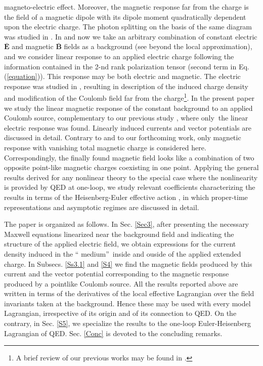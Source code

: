 \documentclass[12pt]{article}
\begin{document}
magneto-electric effect. Moreover, the magnetic response far from the charge
is the field of a magnetic dipole with its dipole moment quadratically
dependent upon the electric charge. The photon splitting on the basis of the
same diagram was studied in \cite{merging}. In \cite{AdoGitSha2016} and now
we take an arbitrary combination of constant electric $\mathbf{\bar{E}}$ and
magnetic $\mathbf{\bar{B}}$ fields as a background (see \cite{BatSha71}
beyond the local approximation), and we consider linear response to an
applied electric charge following the information contained in the 2-nd rank
polarization tensor (second term in Eq. (\ref{equation})). This response may
be both electric and magnetic. The electric response was studied in \cite%
{AdoGitSha2016}, resulting in description of the induced charge density and
modification of the Coulomb field far from the charge\footnote{%
A brief review of our previous works may be found in \cite{AdoGitShaShi2016}.%
}. In the present paper we study the linear magnetic response of the
constant background to an applied Coulomb source, complementary to our
previous study \cite{AdoGitSha2016}, where only\textrm{\textbf{\ }}the
linear electric response was found. Linearly induced currents and vector
potentials are discussed in detail. Contrary to \cite{AdoGitSha2015} and to
our forthcoming work, only magnetic response with vanishing total magnetic
charge is considered here. Correspondingly, the finally found magnetic field
looks like a combination of two opposite point-like magnetic charges
coexisting in one point. Applying the general results derived for any
nonlinear theory to the special case where the nonlinearity is provided by
QED at one-loop, we study relevant coefficients characterizing the results
in terms of the Heisenberg-Euler effective action \cite{Heisenberg}, in
which proper-time representations and asymptotic regimes are discussed in
detail.

The paper is organized as follows. In Sec. \ref{Sec3}, after presenting the
necessary Maxwell equations linearized near the background field and
indicating the structure of the applied electric field, we obtain
expressions for the current density induced in the \textquotedblleft
medium\textquotedblright\ inside and ouside of the applied extended charge.
In Subsecs. \ref{Ss3.1} and \ref{S4} we find the magnetic fields produced by
this current and the vector potential corresponding to the magnetic response
produced by a pointlike Coulomb source. All the results reported above are
written in terms of the derivatives of the local effective Lagrangian over
the field invariants taken at the background. Hence these may be used with
every model Lagrangian, irrespective of its origin and of its connection to
QED. On the contrary, in Sec. \ref{S5}, we specialize the results to the
one-loop Euler-Heisenberg Lagrangian of QED. Sec. \ref{Conc} is devoted to
the concluding remarks.
\end{document}
